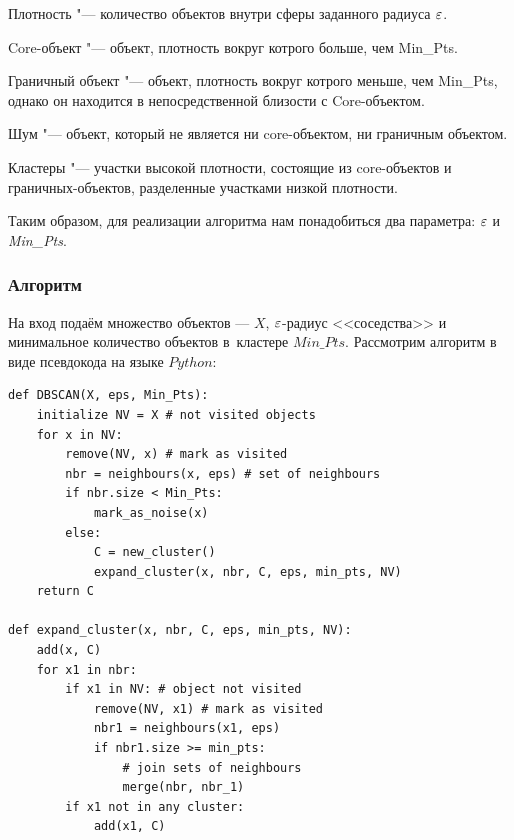 \begin{Def}{Плотность} 
"--- количество объектов внутри сферы заданного радиуса $\varepsilon$.
\end{Def}
\begin{Def}{Core-объект} \label{core}
"--- объект, плотность вокруг котрого больше, чем  Min\_Pts.
\end{Def}
\begin{Def}{Граничный объект} 
"--- объект, плотность вокруг котрого меньше, чем  Min\_Pts, однако он находится в непосредственной близости с Core-объектом.
\end{Def}
\begin{Def}{Шум} 
"--- объект, который не является ни core-объектом, ни граничным объектом. 
\end{Def}
\begin{Def}{Кластеры}
"--- участки высокой плотности, состоящие из core-объектов и граничных-объектов, разделенные участками низкой плотности.
\end{Def}

Таким образом, для реализации алгоритма нам понадобиться два параметра: $\varepsilon$ и {\it Min\_Pts}.

\subsubsection{Алгоритм}
На вход подаём множество объектов --- $X$, $\varepsilon$-радиус <<соседства>> и минимальное количество объектов в~кластере $Min\_Pts$. Рассмотрим алгоритм в виде псевдокода на языке $Python$:
\begin{lstlisting}
def DBSCAN(X, eps, Min_Pts):
    initialize NV = X # not visited objects
    for x in NV:
        remove(NV, x) # mark as visited
        nbr = neighbours(x, eps) # set of neighbours
        if nbr.size < Min_Pts:
            mark_as_noise(x)
        else:
            C = new_cluster()
            expand_cluster(x, nbr, C, eps, min_pts, NV)
    return C

def expand_cluster(x, nbr, C, eps, min_pts, NV):
    add(x, C)
    for x1 in nbr:
        if x1 in NV: # object not visited
            remove(NV, x1) # mark as visited
            nbr1 = neighbours(x1, eps)
            if nbr1.size >= min_pts:
                # join sets of neighbours
                merge(nbr, nbr_1)
        if x1 not in any cluster:
            add(x1, C)
\end{lstlisting}

